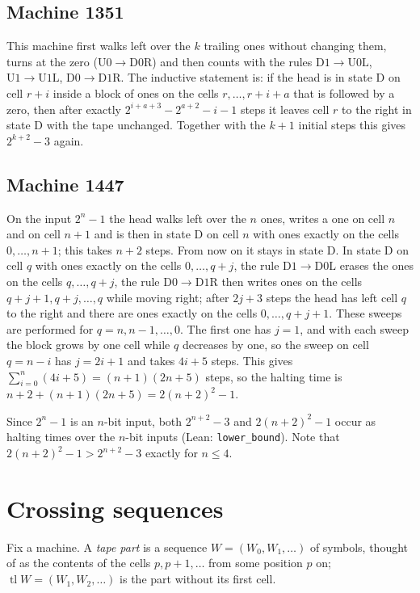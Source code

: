 \documentclass[11pt,a4paper]{amsart}
\theoremstyle{definition}
\theoremstyle{remark}
\newcommand{\U}{\mathrm{U}}
\newcommand{\D}{\mathrm{D}}
\newcommand{\lean}[1]{\texttt{#1}}
\begin{document}
\subsection*{Machine 1351}
This machine first walks left over the $k$ trailing ones without changing them, turns at the zero
($\U0\to\D0\mathrm{R}$) and then counts with the rules $\D1\to\U0\mathrm{L}$, $\U1\to\U1\mathrm{L}$,
$\D0\to\D1\mathrm{R}$. The inductive statement is: if the head is in state $\D$ on cell $r+i$ inside a block of
ones on the cells $r,\dots,r+i+a$ that is followed by a zero, then after exactly $2^{i+a+3}-2^{a+2}-i-1$ steps it
leaves cell $r$ to the right in state $\D$ with the tape unchanged. Together with the $k+1$ initial steps this
gives $2^{k+2}-3$ again.

\subsection*{Machine 1447}
On the input $2^n-1$ the head walks left over the $n$ ones, writes a one on cell $n$ and on cell $n+1$ and is
then in state $\D$ on cell $n$ with ones exactly on the cells $0,\dots,n+1$; this takes $n+2$ steps. From now on
it stays in state $\D$. In state $\D$ on cell $q$ with ones exactly on the cells $0,\dots,q+j$, the rule
$\D1\to\D0\mathrm{L}$ erases the ones on the cells $q,\dots,q+j$, the rule $\D0\to\D1\mathrm{R}$ then writes ones
on the cells $q+j+1,q+j,\dots,q$ while moving right; after $2j+3$ steps the head has left cell $q$ to the right
and there are ones exactly on the cells $0,\dots,q+j+1$. These sweeps are performed for $q=n,n-1,\dots,0$. The
first one has $j=1$, and with each sweep the block grows by one cell while $q$ decreases by one, so the sweep
on cell $q=n-i$ has $j=2i+1$ and takes $4i+5$ steps. This gives $\sum_{i=0}^{n}(4i+5)=(n+1)(2n+5)$ steps, so the
halting time is $n+2+(n+1)(2n+5)=2(n+2)^2-1$.

\medskip
Since $2^n-1$ is an $n$-bit input, both $2^{n+2}-3$ and $2(n+2)^2-1$ occur as halting times over the $n$-bit
inputs (Lean: \lean{lower\_bound}). Note that $2(n+2)^2-1>2^{n+2}-3$ exactly for $n\le4$.

\section{Crossing sequences}\label{sec:crossing}

Fix a machine. A \emph{tape part} is a sequence $W=(W_0,W_1,\dots)$ of symbols, thought of as the contents of
the cells $p,p+1,\dots$ from some position $p$ on; $\operatorname{tl}W=(W_1,W_2,\dots)$ is the part without its
first cell.
\end{document}
